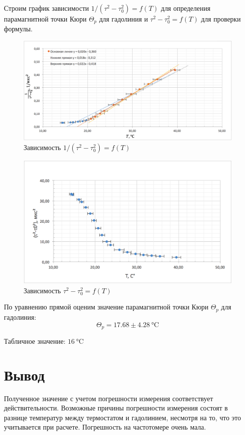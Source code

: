 \documentclass[a4paper, 12pt]{article}
\begin{document}
Строим график зависимости $1/(\tau^2 -\tau_0^2) = f(T)$ для определения парамагнитной точки Кюри $\Theta_p$ для гадолиния и $\tau^2 -\tau_0^2 = f(T)$ для проверки формулы.

\begin{figure}[H]
\centering
	 \includegraphics[width = 0.8 \textwidth]{Graph1}
\caption{Зависимость $1/(\tau^2 -\tau_0^2) = f(T)$}
\end{figure}

\begin{figure}[H]
\centering
	 \includegraphics[width = 0.8 \textwidth]{Graph2}
\caption{Зависимость $\tau^2 -\tau_0^2 = f(T)$}
\end{figure}

По уравнению прямой оценим значение парамагнитной точки Кюри $\Theta_p$ для гадолиния: $$\Theta_p = 17.68 \pm 4.28 \SI{}\degreeCelsius$$

Табличное значение: $\SI{16}\degreeCelsius$

\section{Вывод}

Полученное значение с учетом погрешности измерения соответствует действительности. Возможные причины погрешности измерения состоят в разнице температур между термостатом и гадолинием, несмотря на то, что это учитывается при расчете. Погрешность на частотомере очень мала.
\end{document}
